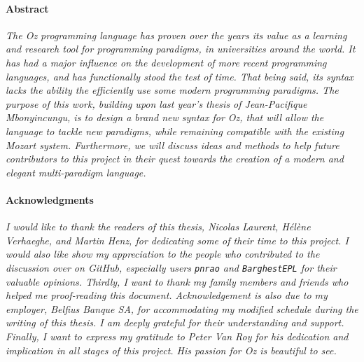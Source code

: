 \paragraph{Abstract}
\textit{
The \textit{Oz} programming language has proven over the years its value as a learning and research tool for programming paradigms, in universities around the world.
It has had a major influence on the development of more recent programming languages, and has functionally stood the test of time.
That being said, its syntax lacks the ability the efficiently use some modern programming paradigms.
The purpose of this work, building upon last year's thesis of Jean-Pacifique Mbonyincungu, is to design a brand new syntax for \textit{Oz}, that will allow the language to tackle new paradigms, while remaining compatible with the existing Mozart system.
Furthermore, we will discuss ideas and methods to help future contributors to this project in their quest towards the creation of a modern and elegant multi-paradigm language.
}
\vfill
\paragraph{Acknowledgments}
\textit{
I would like to thank the readers of this thesis, Nicolas Laurent, Hélène Verhaeghe, and Martin Henz, for dedicating some of their time to this project.\newline
I would also like show my appreciation to the people who contributed to the discussion over on \emph{GitHub}, especially users \texttt{pnrao} and \texttt{BarghestEPL} for their valuable opinions.\newline
Thirdly, I want to thank my family members and friends who helped me proof-reading this document.\newline
Acknowledgement is also due to my employer, \emph{Belfius Banque SA}, for accommodating my modified schedule during the writing of this thesis. I am deeply grateful for their understanding and support.\newline
Finally, I want to express my gratitude to Peter Van Roy for his dedication and implication in all stages of this project. His passion for \emph{Oz} is beautiful to see.
}